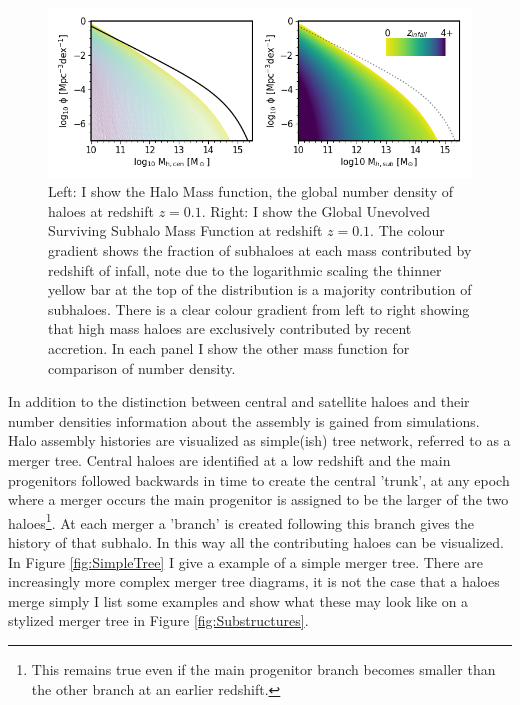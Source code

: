 \begin{figure}[h]
	\centering
	\includegraphics[width = \linewidth]{Figures/Chapter1/SubHaloes_byz.png}
    \caption{Left: I show the Halo Mass function, the global number density of haloes at redshift $z=0.1$. Right: I show the Global Unevolved Surviving Subhalo Mass Function at redshift $z=0.1$. The colour gradient shows the fraction of subhaloes at each mass contributed by redshift of infall, note due to the logarithmic scaling the thinner yellow bar at the top of the distribution is a majority contribution of subhaloes. There is a clear colour gradient from left to right showing that high mass haloes are exclusively contributed by recent accretion. In each panel I show the other mass function for comparison of number density.}
	\label{fig:SubHaloes_byz}
\end{figure}

In addition to the distinction between central and satellite haloes and their number densities information about the assembly is gained from simulations. Halo assembly histories are visualized as simple(ish) tree network, referred to as a merger tree. Central haloes are identified at a low redshift and the main progenitors followed backwards in time to create the central 'trunk', at any epoch where a merger occurs the main progenitor is assigned to be the larger of the two haloes\footnote{This remains true even if the main progenitor branch becomes smaller than the other branch at an earlier redshift.}. At each merger a 'branch' is created following this branch gives the history of that subhalo. In this way all the contributing haloes can be visualized. In Figure \ref{fig:SimpleTree} I give a example of a simple merger tree. There are increasingly more complex merger tree diagrams, it is not the case that a haloes merge simply I list some examples and show what these may look like on a stylized merger tree in Figure \ref{fig:Substructures}.

